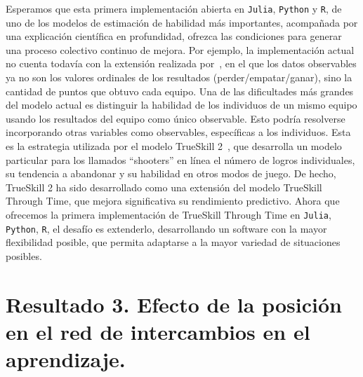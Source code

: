 \documentclass[a4paper,11pt]{book}
\theoremstyle{definition}
\begin{document}
Esperamos que esta primera implementaci\'on abierta en \texttt{Julia}, \texttt{Python} y \texttt{R}, de uno de los modelos de estimaci\'on de habilidad m\'as importantes, acompa\~nada por una explicaci\'on cient\'ifica en profundidad, ofrezca las condiciones para generar una proceso colectivo continuo de mejora.
%
Por ejemplo, la implementaci\'on actual no cuenta todav\'ia con la extensi\'on realizada por~\cite{Guo2012}, en el que los datos observables ya no son los valores ordinales de los resultados (perder/empatar/ganar), sino la cantidad de puntos que obtuvo cada equipo.
%
Una de las dificultades m\'as grandes del modelo actual es distinguir la habilidad de los individuos de un mismo equipo usando los resultados del equipo como \'unico observable.
%
Esto podr\'ia resolverse incorporando otras variables como observables, espec\'ificas a los individuos.
%
Esta es la estrategia utilizada por el modelo TrueSkill 2~\cite{minka2018-trueskill2}, que desarrolla un modelo particular para los llamados ``shooters'' en l\'inea el n\'umero de logros individuales, su tendencia a abandonar y su habilidad en otros modos de juego.
%
De hecho, TrueSkill 2 ha sido desarrollado como una extensi\'on del modelo TrueSkill Through Time, que mejora significativa su rendimiento predictivo.
%
Ahora que ofrecemos la primera implementaci\'on de TrueSkill Through Time en \texttt{Julia}, \texttt{Python}, \texttt{R}, el desaf\'io es extenderlo, desarrollando un software con la mayor flexibilidad posible, que permita adaptarse a la mayor variedad de situaciones posibles.
%
%











\chapter{Resultado 3. Efecto de la posici\'on en el red de intercambios en el aprendizaje.}\label{ch:topo}
\end{document}
